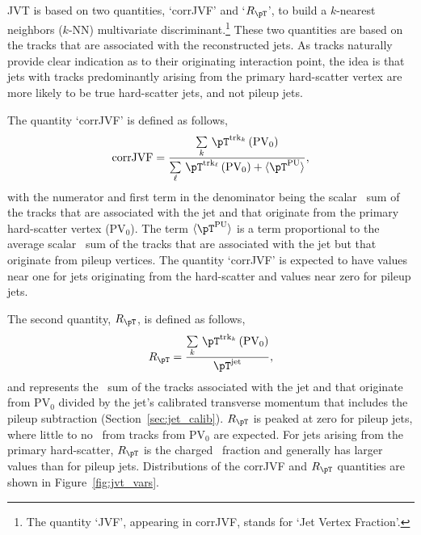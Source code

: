 JVT is based on two quantities, `corrJVF' and `$R_{\pT}$', to build a $k$-nearest neighbors ($k$-NN)
multivariate discriminant.\footnote{The quantity `JVF', appearing in corrJVF, stands for `Jet Vertex Fraction'.}
These two quantities are based on the tracks that are associated with the reconstructed jets.
As tracks naturally provide clear indication as to their originating interaction point, 
the idea is that jets with tracks predominantly arising from the primary hard-scatter vertex
are more likely to be true hard-scatter jets, and not pileup jets.

The quantity `corrJVF' is defined as follows,
\begin{align}
    \text{corrJVF} = \frac{
                        \sum\limits_{k}\, \pT^{\text{trk}_k} \left( \text{PV}_0 \right)
                    }
                    {
                        \sum\limits_{\ell} \, \pT^{\text{trk}_{\ell}} \left( \text{PV}_0 \right) +  \langle \pT^{\text{PU}} \rangle
                    },
    \label{eq:corrJVF}
\end{align}
with the numerator and first term in the denominator being the scalar \pT~sum of the tracks that are associated
with the jet and that originate from the primary hard-scatter vertex ($\text{PV}_0$).
The term $\langle \pT^{\text{PU}} \rangle$ is a term proportional to the average scalar \pT~sum of the tracks
that are associated with the jet but that originate from pileup vertices.
The quantity `corrJVF' is expected to have values near one for jets originating from the hard-scatter and values
near zero for pileup jets.

The second quantity, $R_{\pT}$, is defined as follows,
\begin{align}
    R_{\pT} = \frac{
                    \sum\limits_k \, \pT^{\text{trk}_k} \left( \text{PV}_0 \right)
                }
                {
                    \pT^{\text{jet}}
                },
\end{align}
and represents the \pT~sum of the tracks associated with the jet and that originate from $\text{PV}_0$
divided by the jet's calibrated transverse momentum that includes the pileup subtraction (Section~\ref{sec:jet_calib}).
$R_{\pT}$ is peaked at zero for pileup jets, where little to no \pT~from tracks from $\text{PV}_0$ are expected.
For jets arising from the primary hard-scatter, $R_{\pT}$ is the charged \pT~fraction and generally has larger values
than for pileup jets.
Distributions of the corrJVF and $R_{\pT}$ quantities are shown in Figure~\ref{fig:jvt_vars}.

